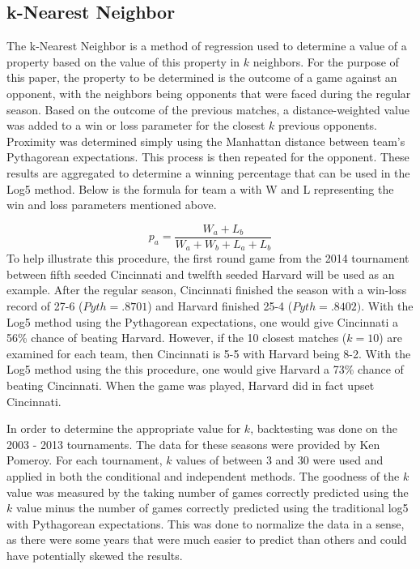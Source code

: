 \documentclass[5p, preprint]{elsarticle}
\begin{document}
\subsection{k-Nearest Neighbor}

The k-Nearest Neighbor is a method of regression used to determine a value of a property based on the value of this property in $k$ neighbors. For the purpose of this paper, the property to be determined is the outcome of a game against an opponent, with the neighbors being opponents that were faced during the regular season.  Based on the outcome of the previous matches, a distance-weighted value was added to a win or loss parameter for the closest $k$ previous opponents. Proximity was determined simply using the Manhattan distance between team's Pythagorean expectations. This process is then repeated for the opponent. These results are aggregated to determine a winning percentage that can be used in the Log5 method. Below is the formula for team a with W and L representing the win and loss parameters mentioned above.

\[
p_{a} = \frac{W_a + L_b}{W_a + W_b + L_a + L_b}
\]
To help illustrate this procedure, the first round game from the 2014 tournament between fifth seeded Cincinnati and twelfth seeded Harvard will be used as an example.  After the regular season, Cincinnati finished the season with a win-loss record of 27-6 ($Pyth = .8701$) and Harvard finished 25-4 ($Pyth = .8402)$. With the Log5 method using the Pythagorean expectations, one would give Cincinnati a 56\% chance of beating Harvard. However, if the 10 closest matches ($k=10$) are examined for each team, then Cincinnati is 5-5 with Harvard being 8-2. With the Log5 method using the this procedure, one would give Harvard a 73\% chance of beating Cincinnati.  When the game was played, Harvard did in fact upset Cincinnati.

In order to determine the appropriate value for $k$, backtesting was done on the 2003 - 2013 tournaments. The data for these seasons were provided by Ken Pomeroy. For each tournament, $k$ values of between 3 and 30 were used and applied in both the conditional and independent methods. The goodness of the $k$ value was measured by the taking number of games correctly predicted using the $k$ value  minus the number of games correctly predicted using the traditional log5 with Pythagorean expectations. This was done to normalize the data in a sense, as there were some years that were much easier to predict than others and could have potentially skewed the results.
\end{document}
